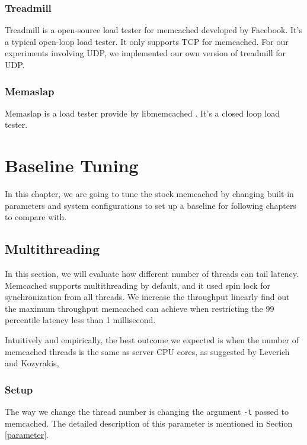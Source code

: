 \documentclass[bsc,frontabs,twoside,singlespacing,parskip,deptreport]{infthesis}     %
\begin{document}
\subsection{Treadmill}

Treadmill \cite{DBLP:conf/isca/ZhangMMT16} is a open-source load tester for memcached developed by Facebook. It's a typical open-loop load tester. It only supports TCP for memcached. For our experiments involving UDP, we implemented our own version of treadmill for UDP.



\subsection{Memaslap}

Memaslap is a load tester provide by libmemcached \cite{P2}. It's a closed loop load tester.  



\chapter{Baseline Tuning}
In this chapter, we are going to tune the stock memcached by changing built-in parameters and system configurations to set up a baseline for following chapters to compare with.

\section{Multithreading}

In this section, we will evaluate how different number of threads can tail latency. Memcached supports multithreading by default, and it used spin lock %
for synchronization from all threads. We increase the throughput linearly find out the maximum throughput memcached can achieve when restricting the 99 percentile latency less than 1 millisecond. 


Intuitively and empirically, the best outcome we expected is when the number of memcached threads is the same as server CPU cores, as suggested by Leverich and Kozyrakis\cite{DBLP:conf/eurosys/LeverichK14},



\subsection{Setup}
The way we change the thread number is changing the argument \texttt{-t} passed to memcached. The detailed description of this parameter is mentioned in Section \ref{parameter}. 
\end{document}
